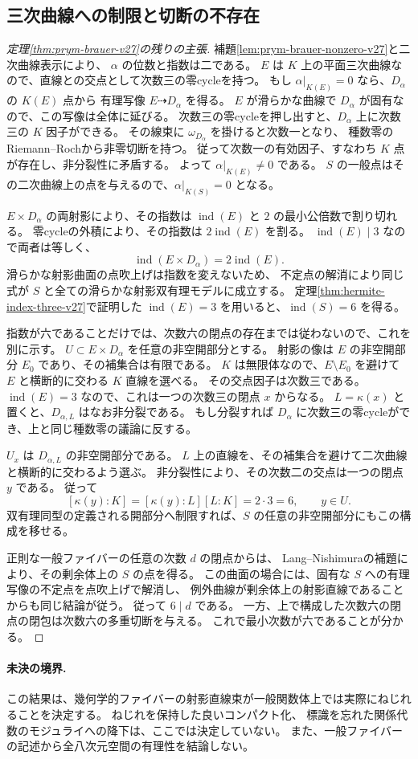 \subsection{三次曲線への制限と切断の不存在}
\begin{proof}[定理\ref{thm:prym-brauer-v27}の残りの主張]
補題\ref{lem:prym-brauer-nonzero-v27}と二次曲線表示により、
$\alpha$ の位数と指数は二である。
$E$ は $K$ 上の平面三次曲線なので、直線との交点として次数三の零cycleを持つ。
もし $\alpha|_{K(E)}=0$ なら、$D_\alpha$ の $K(E)$ 点から
有理写像 $E\dashrightarrow D_\alpha$ を得る。
$E$ が滑らかな曲線で $D_\alpha$ が固有なので、この写像は全体に延びる。
次数三の零cycleを押し出すと、$D_\alpha$ 上に次数三の $K$ 因子ができる。
その線束に $\omega_{D_\alpha}$ を掛けると次数一となり、
種数零のRiemann--Rochから非零切断を持つ。
従って次数一の有効因子、すなわち $K$ 点が存在し、非分裂性に矛盾する。
よって $\alpha|_{K(E)}\ne0$ である。
$S$ の一般点はその二次曲線上の点を与えるので、$\alpha|_{K(S)}=0$ となる。

$E\times D_\alpha$ の両射影により、その指数は
$\operatorname{ind}(E)$ と $2$ の最小公倍数で割り切れる。
零cycleの外積により、その指数は $2\operatorname{ind}(E)$ を割る。
$\operatorname{ind}(E)\mid3$ なので両者は等しく、
\[
 \operatorname{ind}(E\times D_\alpha)=2\operatorname{ind}(E).
\]
滑らかな射影曲面の点吹上げは指数を変えないため、
不定点の解消により同じ式が $S$ と全ての滑らかな射影双有理モデルに成立する。
定理\ref{thm:hermite-index-three-v27}で証明した
$\operatorname{ind}(E)=3$ を用いると、$\operatorname{ind}(S)=6$ を得る。

指数が六であることだけでは、次数六の閉点の存在までは従わないので、これを別に示す。
$U\subset E\times D_\alpha$ を任意の非空開部分とする。
射影の像は $E$ の非空開部分 $E_0$ であり、その補集合は有限である。
$K$ は無限体なので、$E\setminus E_0$ を避けて $E$ と横断的に交わる $K$ 直線を選べる。
その交点因子は次数三である。
$\operatorname{ind}(E)=3$ なので、これは一つの次数三の閉点 $x$ からなる。
$L=\kappa(x)$ と置くと、$D_{\alpha,L}$ はなお非分裂である。
もし分裂すれば $D_\alpha$ に次数三の零cycleができ、上と同じ種数零の議論に反する。

$U_x$ は $D_{\alpha,L}$ の非空開部分である。
$L$ 上の直線を、その補集合を避けて二次曲線と横断的に交わるよう選ぶ。
非分裂性により、その次数二の交点は一つの閉点 $y$ である。
従って
\[
 [\kappa(y):K]=[\kappa(y):L][L:K]=2\cdot3=6,
 \qquad y\in U.
\]
双有理同型の定義される開部分へ制限すれば、$S$ の任意の非空開部分にもこの構成を移せる。

正則な一般ファイバーの任意の次数 $d$ の閉点からは、
Lang--Nishimuraの補題により、その剰余体上の $S$ の点を得る。
この曲面の場合には、固有な $S$ への有理写像の不定点を点吹上げで解消し、
例外曲線が剰余体上の射影直線であることからも同じ結論が従う。
従って $6\mid d$ である。
一方、上で構成した次数六の閉点の閉包は次数六の多重切断を与える。
これで最小次数が六であることが分かる。
\end{proof}

\paragraph{未決の境界.}
この結果は、幾何学的ファイバーの射影直線束が一般関数体上では実際にねじれることを決定する。
ねじれを保持した良いコンパクト化、
標識を忘れた関係代数のモジュライへの降下は、ここでは決定していない。
また、一般ファイバーの記述から全八次元空間の有理性を結論しない。
